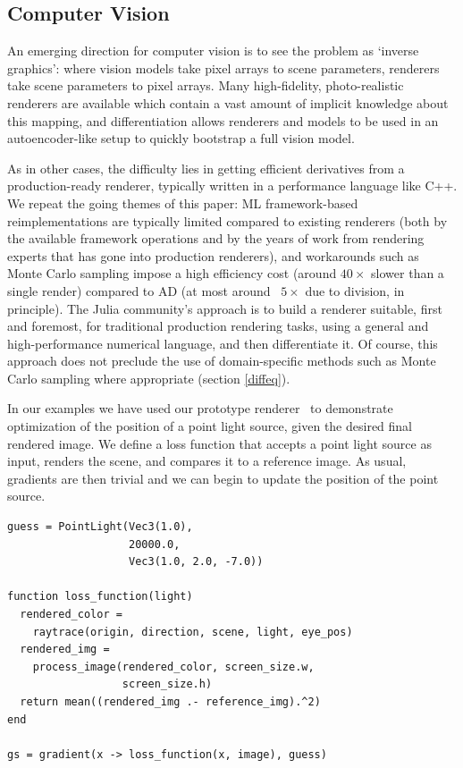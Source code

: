 \documentclass{juliacon}
\begin{document}
\subsection{Computer Vision}

An emerging direction for computer vision is to see the problem as `inverse graphics': where vision models take pixel arrays to scene parameters, renderers take scene parameters to pixel arrays. Many high-fidelity, photo-realistic renderers are available which contain a vast amount of implicit knowledge about this mapping, and differentiation allows renderers and models to be used in an autoencoder-like setup to quickly bootstrap a full vision model.

As in other cases, the difficulty lies in getting efficient derivatives from a production-ready renderer, typically written in a performance language like C++. We repeat the going themes of this paper: ML framework-based reimplementations are typically limited compared to existing renderers (both by the available framework operations and by the years of work from rendering experts that has gone into production renderers), and workarounds such as Monte Carlo sampling \cite{li2018differentiable} impose a high efficiency cost (around $40\times$ slower than a single render) compared to AD (at most around ~$5\times$ due to division, in principle). The Julia community's approach is to build a renderer suitable, first and foremost, for traditional production rendering tasks, using a general and high-performance numerical language, and then differentiate it. Of course, this approach does not preclude the use of domain-specific methods such as Monte Carlo sampling where appropriate (section \ref{diffeq}).

In our examples we have used our prototype renderer~\cite{diffrender} to demonstrate optimization of the position of a point light source, given the desired final rendered image. We define a loss function that accepts a point light source as input, renders the scene, and compares it to a reference image. As usual, gradients are then trivial and we can begin to update the position of the point source.

\begin{verbatim}
guess = PointLight(Vec3(1.0),
                   20000.0,
                   Vec3(1.0, 2.0, -7.0))

function loss_function(light)
  rendered_color =
    raytrace(origin, direction, scene, light, eye_pos)
  rendered_img =
    process_image(rendered_color, screen_size.w,
                  screen_size.h)
  return mean((rendered_img .- reference_img).^2)
end

gs = gradient(x -> loss_function(x, image), guess) 
\end{verbatim}
\end{document}
